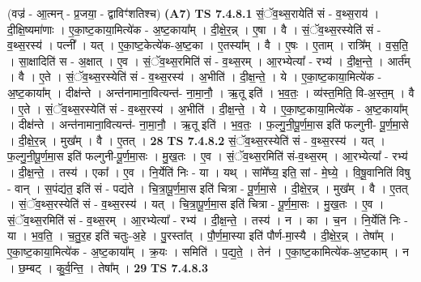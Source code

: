 \documentclass[17pt]{extarticle}
\begin{document}
                  \newline
                      (वज्र॑ - आ॒त्मन् - प्र॒जया॒ - द्वाविꣳ॑शतिश्च)  \textbf{(A7)} \newline \newline
                                \textbf{ TS 7.4.8.1} \newline
                  सं॒ॅव॒थ्स॒रायेति॑ सं - व॒थ्स॒राय॑ । दी॒क्षि॒ष्यमा॑णाः । ए॒का॒ष्ट॒काया॒मित्ये॑क - अ॒ष्ट॒काया᳚म् । दी॒क्षे॒र॒न्न् । ए॒षा । वै । सं॒ॅव॒थ्स॒रस्येति॑ सं - व॒थ्स॒रस्य॑ । पत्नी᳚ । यत् । ए॒का॒ष्ट॒केत्ये॑क-अ॒ष्ट॒का । ए॒तस्या᳚म् । वै । ए॒षः । ए॒ताम् । रात्रि᳚म् । व॒स॒ति॒ । सा॒क्षादिति॑ स - अ॒क्षात् । ए॒व । सं॒ॅव॒थ्स॒रमिति॑ सं -  व॒थ्स॒रम् । आ॒रभ्येत्या᳚ - रभ्य॑ । दी॒क्ष॒न्ते॒ । आर्त᳚म् । वै । ए॒ते । सं॒ॅव॒थ्स॒रस्येति॑ सं - व॒थ्स॒रस्य॑ । अ॒भीति॑ । दी॒क्ष॒न्ते॒ । ये । ए॒का॒ष्ट॒काया॒मित्ये॑क - अ॒ष्ट॒काया᳚म् । दीक्ष॑न्ते । अन्त॑नामाना॒वित्यन्त॑- ना॒मा॒नौ॒ । ऋ॒तू इति॑ । भ॒व॒तः॒ । व्य॑स्त॒मिति॒ वि-अ॒स्त॒म् । वै । ए॒ते । सं॒ॅव॒थ्स॒रस्येति॑ सं - व॒थ्स॒रस्य॑ । अ॒भीति॑ । दी॒क्ष॒न्ते॒ । ये । ए॒का॒ष्ट॒काया॒मित्ये॑क - अ॒ष्ट॒काया᳚म् । दीक्ष॑न्ते । अन्त॑नामाना॒वित्यन्त॑- ना॒मा॒नौ॒ । ऋ॒तू इति॑ । भ॒व॒तः॒ । फ॒ल्गु॒नी॒पू॒र्ण॒मा॒स इति॑ फल्गुनी- पू॒र्ण॒मा॒से । दी॒क्षे॒र॒न्न् । मुख᳚म् । वै । ए॒तत् । \textbf{  28} \newline
                  \newline
                                \textbf{ TS 7.4.8.2} \newline
                  सं॒ॅव॒थ्स॒रस्येति॑ सं - व॒थ्स॒रस्य॑ । यत् । फ॒ल्गु॒नी॒पू॒र्ण॒मा॒स इति॑ फल्गुनी-पू॒र्ण॒मा॒सः । मु॒ख॒तः । ए॒व । सं॒ॅव॒थ्स॒रमिति॑ सं-व॒थ्स॒रम् । आ॒रभ्येत्या᳚ - रभ्य॑ । दी॒क्ष॒न्ते॒ । तस्य॑ । एका᳚ । ए॒व । नि॒र्येति॑ निः - या । यथ् । सांमे᳚घ्य॒ इति॒ सां - मे॒घ्ये॒ । वि॒षू॒वानिति॑ विषु - वान् । स॒पंद्य॑त॒ इति॑ सं - पद्य॑ते । चि॒त्रा॒पू॒र्ण॒मा॒स इति॑ चित्रा - पू॒र्ण॒मा॒से । दी॒क्षे॒र॒न्न् । मुख᳚म् । वै । ए॒तत् । सं॒ॅव॒थ्स॒रस्येति॑ सं - व॒थ्स॒रस्य॑ । यत् । चि॒त्रा॒पू॒र्ण॒मा॒स इति॑ चित्रा - पू॒र्ण॒मा॒सः । मु॒ख॒तः । ए॒व । सं॒ॅव॒थ्स॒रमिति॑ सं - व॒थ्स॒रम् । आ॒रभ्येत्या᳚ - रभ्य॑ । दी॒क्ष॒न्ते॒ । तस्य॑ । न । का । च॒न । नि॒र्येति॑ निः - या । भ॒व॒ति॒ । च॒तु॒र॒ह इति॑ चतुः-अ॒हे । पु॒रस्ता᳚त् । पौ॒र्ण॒मा॒स्या इति॑ पौर्ण-मा॒स्यै । दी॒क्षे॒र॒न्न् । तेषा᳚म् । ए॒का॒ष्ट॒काया॒मित्ये॑क - अ॒ष्ट॒काया᳚म् । क्र॒यः । समिति॑ । प॒द्य॒ते॒ । तेन॑ । ए॒का॒ष्ट॒कामित्ये॑क-अ॒ष्ट॒काम् । न । छ॒म्बट् । कु॒र्व॒न्ति॒ । तेषा᳚म् । \textbf{  29} \newline
                  \newline
                                \textbf{ TS 7.4.8.3} \newline
\end{document}
